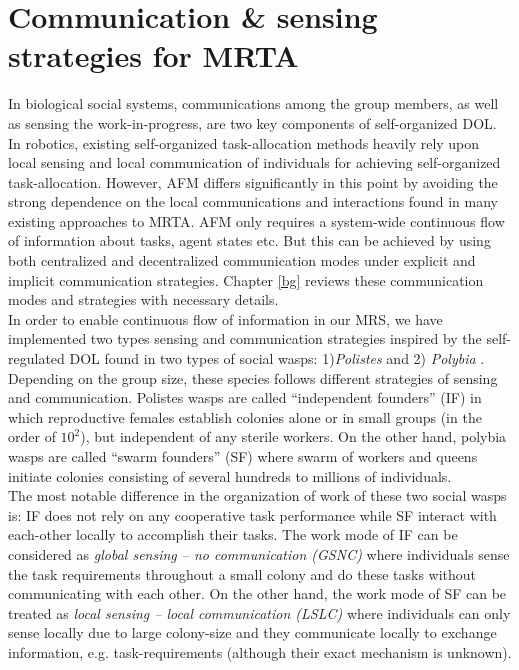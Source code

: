 \section{Communication \& sensing strategies for MRTA}
\label{intro:comm}
In biological social systems, communications among the group members, as well as sensing the work-in-progress, are two key components of self-organized DOL. In robotics, existing self-organized task-allocation methods heavily rely upon local  sensing and local communication of individuals for achieving self-organized task-allocation. However,  AFM differs significantly in this point by avoiding the strong dependence on the local communications and interactions found in many existing approaches to MRTA. AFM only requires a system-wide continuous flow of information about tasks, agent states etc. But this can be achieved by using both centralized and decentralized communication modes under explicit and implicit communication strategies. Chapter \ref{bg} reviews these communication modes and strategies with necessary details.\\
In order to enable continuous flow of information in our MRS, we have implemented two types sensing and communication strategies inspired by the self-regulated DOL found in two types of social wasps: 1){\em Polistes} and 2)  {\em Polybia} \cite{Jeanne1999}. Depending on the group size, these species follows different strategies of sensing and communication.   Polistes wasps are called  ``independent founders'' (IF) in which reproductive females establish colonies alone or in small groups (in the order of $10^2$), but independent of any sterile workers. On the other hand, polybia wasps are called ``swarm founders'' (SF) where swarm of workers and queens initiate colonies consisting of several hundreds to millions of individuals.\\
The most notable difference in the organization of work of these two social wasps is: IF does not rely on any cooperative task performance while SF interact with each-other locally to accomplish their tasks. The work mode of IF can be considered as {\em global sensing – no communication (GSNC)} where individuals sense the task requirements throughout a small colony and do these tasks without communicating with each other. On the other hand, the work mode of SF can be treated as {\em local sensing – local communication (LSLC)} where individuals can only sense locally due to large colony-size and they communicate locally to exchange information, e.g. task-requirements (although their exact mechanism is unknown).\\
